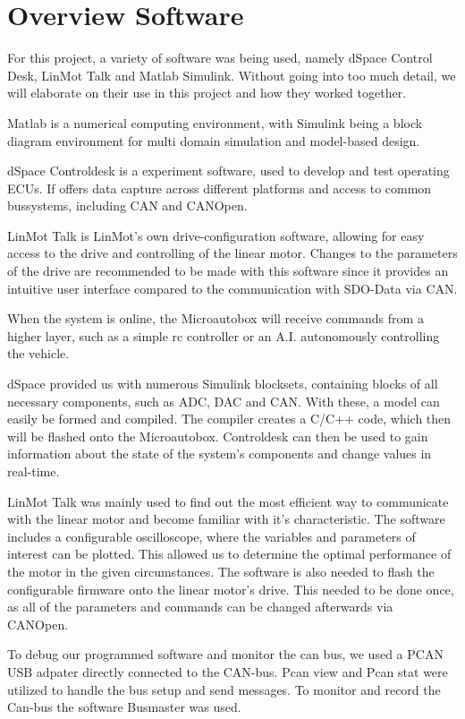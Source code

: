 
\chapter{Overview Software}
\label{chp:Software}

For this project, a variety of software was being used, namely dSpace Control Desk, LinMot Talk and Matlab Simulink. Without going into too much detail, we will elaborate on their use in this project and how they worked together.


Matlab is a numerical computing environment, with Simulink being a block diagram environment for multi domain simulation and model-based design.

dSpace Controldesk is a experiment software, used to develop and test operating ECUs. If offers data capture across different platforms and access to common bussystems, including CAN and CANOpen.

LinMot Talk is LinMot's own drive-configuration software, allowing for easy access to the drive and controlling of the linear motor. Changes to the parameters of the drive are recommended to be made with this software since it provides an intuitive user interface compared to the communication with SDO-Data via CAN.

When the system is online, the Microautobox will receive commands from a higher layer, such as a simple rc controller or an A.I. autonomously controlling the vehicle. 

dSpace provided us with numerous Simulink blocksets, containing blocks of all necessary components, such as ADC, DAC and CAN. With these, a model can easily be formed and compiled. The compiler creates a C/C++ code, which then will be flashed onto the Microautobox. Controldesk can then be used to gain information about the state of the system's components and change values in real-time.

LinMot Talk was mainly used to find out the most efficient way to communicate with the linear motor and become familiar with it's characteristic. The software includes a configurable oscilloscope, where the variables and parameters of interest can be plotted. This allowed us to determine the optimal performance of the motor in the given circumstances.
The software is also needed to flash the configurable firmware onto the linear motor's drive. This needed to be done once, as all of the parameters and commands can be changed afterwards via CANOpen.

To debug our programmed software and monitor the can bus, we used a PCAN USB adpater directly connected to the CAN-bus. Pcan view and Pcan stat were utilized to handle the bus setup and send messages. To monitor and record the Can-bus the software Busmaster was used.

